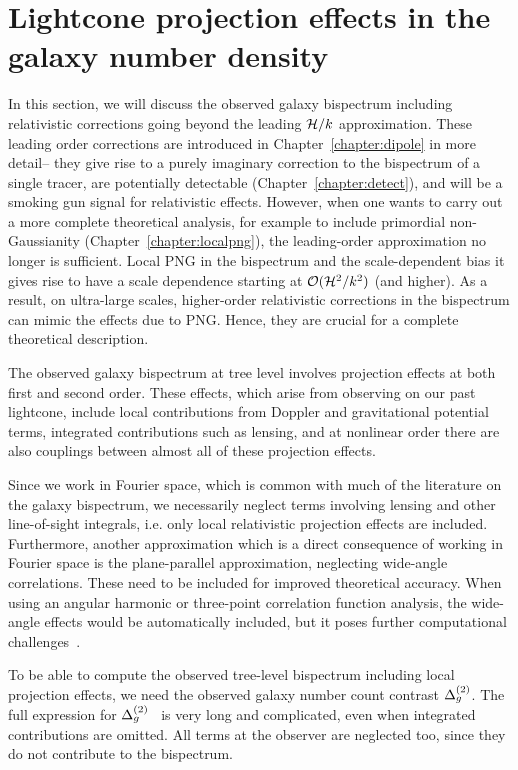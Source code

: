 \section{Lightcone projection effects in the galaxy number density}\label{sec:localproj}

In this section, we will discuss the observed galaxy bispectrum including relativistic corrections going beyond the leading $\mathcal{H}/k$ approximation. These leading order corrections are introduced in Chapter~\ref{chapter:dipole} in more detail-- they give rise to a purely imaginary correction to the bispectrum of a single tracer, are potentially detectable (Chapter~\ref{chapter:detect}), and will be a smoking gun signal for relativistic effects. However, when one wants to carry out a more complete theoretical analysis, for example to include primordial non-Gaussianity (Chapter~\ref{chapter:localpng}), the leading-order approximation no longer is sufficient. Local PNG in the bispectrum and the scale-dependent bias it gives rise to have a scale dependence starting at $\mathcal{O}(\mathcal{H}^2/k^2)$ (and higher). As a result, on ultra-large scales, higher-order relativistic corrections in the bispectrum can mimic the effects due to PNG. Hence, they are crucial for a complete theoretical description.

The observed galaxy bispectrum at tree level involves projection effects at both first and second order. These effects, which arise from observing on our past lightcone, include local contributions from Doppler and gravitational potential terms, integrated contributions such as lensing, and at nonlinear order there are also couplings between almost all of these projection effects. 

Since we work in Fourier space, which is common with much of the literature on the galaxy bispectrum, we necessarily neglect terms involving lensing and other line-of-sight integrals, i.e. only local relativistic projection effects are included. Furthermore, another approximation which is a direct consequence of working in Fourier space is the plane-parallel approximation, neglecting wide-angle correlations. These need to be included for improved theoretical accuracy. When using an angular harmonic or three-point correlation function analysis, the wide-angle effects would be automatically included, but it poses further computational challenges~\cite{Bertacca:2017dzm}. 

To be able to compute the observed tree-level bispectrum including local projection effects, we need the observed galaxy number count contrast $\Delta_g^{(2)}$. The full expression for $\Delta_g^{(2)}$~\cite{Bertacca:2014dra,Bertacca:2014wga,Bertacca:2014hwa,Yoo:2014sfa,DiDio:2014lka} is very long and complicated, even when integrated contributions are omitted. All terms at the observer are neglected too, since they do not contribute to the bispectrum. 

